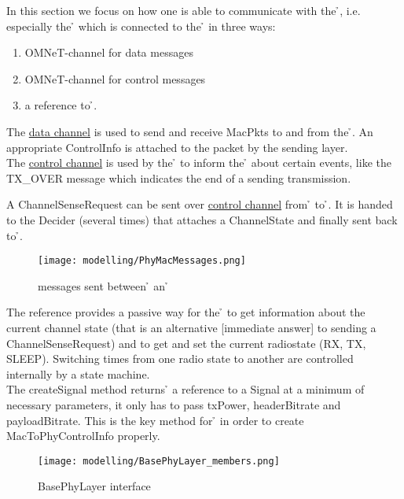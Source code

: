 In this section we focus on how one is able to communicate with the 
\h{\bp}, i.e. especially the \h{\bm} which is connected to the \h{\bp}
in three ways:

\begin{enumerate}
 \item OMNeT-channel for data messages
 \item OMNeT-channel for control messages
 \item a reference to \h{\bp}.
\end{enumerate} 

The \underline{data channel} is used to send and receive MacPkts to and
from the \h{\bp}. An appropriate ControlInfo is attached to the packet by the sending layer. \\

The \underline{control channel} is used by the \h{\bp} to inform the \h{\bm} about
certain events, like the TX\_OVER message 
which indicates the end of a sending transmission.

A ChannelSenseRequest can be sent over \underline{control channel} from \h{\bm} to \h{\bp}. It is handed to the Decider (several times) that attaches a ChannelState and finally sent back to \h{\bm}.
\begin{figure}[H]
 \centering
 \texttt{[image: modelling/PhyMacMessages.png]}
 \caption{messages sent between \h{\bp} an \h{\bm}}
 \label{fig: PhyMacMessages}
\end{figure}


The reference provides a passive way for the  \h{\bm} to  get
information about the current channel state (that is an alternative [immediate answer] to sending a ChannelSenseRequest) and to
get and set the current radiostate (RX, TX,
SLEEP).
Switching times from one radio state to another are controlled
internally by a state machine. 
\\

The createSignal method returns \h{\bm} a reference to a Signal at a minimum of necessary parameters, it only has to pass txPower, headerBitrate and payloadBitrate. This is the key method for \h{\bm} in order to create MacToPhyControlInfo properly.

\label{SignalCreation}

\begin{figure}[H]
 \centering
 \texttt{[image: modelling/BasePhyLayer\_members.png]}
 \caption{BasePhyLayer interface}
 \label{fig: BasePhyLayer interface}
\end{figure}



